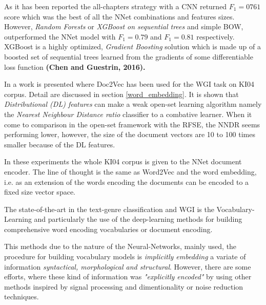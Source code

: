As it has been reported the all-chapters strategy with a CNN returned $F_{1}=0761$ score which was the best of all the NNet combinations and features sizes. However, \textit{Random Forests} or \textit{XGBoost on sequential trees} and simple BOW, outperformed the NNet model with $F_{1}=0.79$ and $F_{1}=0.81$ respectively. XGBoost is a highly optimized, \textit{Gradient Boosting }solution which is made up of a boosted set of sequential trees learned from the gradients of some differentiable loss function\textbf{ (Chen and Guestrin, 2016).}

In \parencite{pritsos2019open} a work is presented where Doc2Vec has been used for the WGI task on KI04 corpus. Detail are discussed in section \ref{word_embedding}. It is shown that \textit{Distributional (DL) features} can make a weak open-set learning algorithm namely the \textit{Nearest Neighbour Distance ratio} classifier to a combative learner. When it come to comparison in the open-set framework with the RFSE, the NNDR seems performing lower, however, the size of the document vectors are 10 to 100 times smaller because of the DL features. 

In these experiments the whole KI04 corpus is given to the NNet document encoder. The line of thought is the same as Word2Vec and the word embedding, i.e. as an extension of the words encoding the documents can be encoded to a fixed size vector space. 




The state-of-the-art in the text-genre classification and WGI is the Vocabulary-Learning and particularly the use of the deep-learning methods for building comprehensive word encoding vocabularies or document encoding. 

This methods due to the nature of the Neural-Networks, mainly used,  the procedure for building vocabulary models is \textit{implicitly embedding} a variate of information\textit{ syntactical, morphological and structural}. However, there are some efforts, where these kind of information was \textit{"explicitly encoded"} by using other methods inspired by signal processing and dimentionality or noise reduction techniques.


